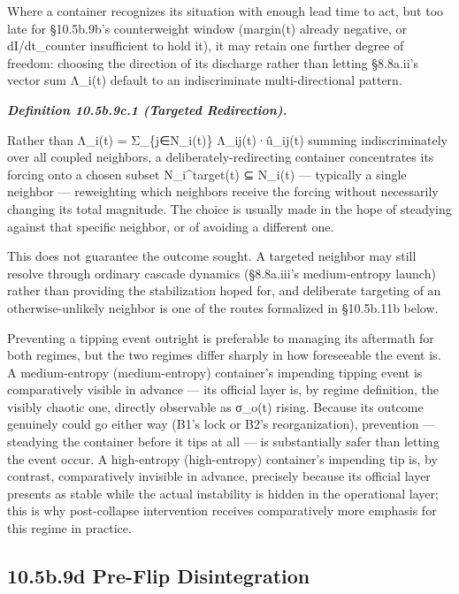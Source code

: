 \documentclass[
]{article}
\begin{document}
Where a container recognizes its situation with enough lead time to act,
but too late for §10.5b.9b's counterweight window (margin(t) already
negative, or dI/dt\_counter insufficient to hold it), it may retain one
further degree of freedom: choosing the direction of its discharge
rather than letting §8.8a.ii's vector sum ⃗Λ\_i(t) default to an
indiscriminate multi-directional pattern.

\emph{\textbf{Definition 10.5b.9c.1 (Targeted Redirection).}}

Rather than ⃗Λ\_i(t) = Σ\_\{j∈N\_i(t)\} Λ\_ij(t)·û\_ij(t) summing
indiscriminately over all coupled neighbors, a deliberately-redirecting
container concentrates its forcing onto a chosen subset
N\_i\^{}target(t) ⊆ N\_i(t) --- typically a single neighbor ---
reweighting which neighbors receive the forcing without necessarily
changing its total magnitude. The choice is usually made in the hope of
steadying against that specific neighbor, or of avoiding a different
one.

This does not guarantee the outcome sought. A targeted neighbor may
still resolve through ordinary cascade dynamics (§8.8a.iii's
medium-entropy launch) rather than providing the stabilization hoped
for, and deliberate targeting of an otherwise-unlikely neighbor is one
of the routes formalized in §10.5b.11b below.

Preventing a tipping event outright is preferable to managing its
aftermath for both regimes, but the two regimes differ sharply in how
foreseeable the event is. A medium-entropy (medium-entropy) container's
impending tipping event is comparatively visible in advance --- its
official layer is, by regime definition, the visibly chaotic one,
directly observable as σ\_o(t) rising. Because its outcome genuinely
could go either way (B1's lock or B2's reorganization), prevention ---
steadying the container before it tips at all --- is substantially safer
than letting the event occur. A high-entropy (high-entropy) container's
impending tip is, by contrast, comparatively invisible in advance,
precisely because its official layer presents as stable while the actual
instability is hidden in the operational layer; this is why
post-collapse intervention receives comparatively more emphasis for this
regime in practice.

\hypertarget{b.9d-pre-flip-disintegration}{%
\subsection{10.5b.9d Pre-Flip
Disintegration}\label{b.9d-pre-flip-disintegration}}
\end{document}
